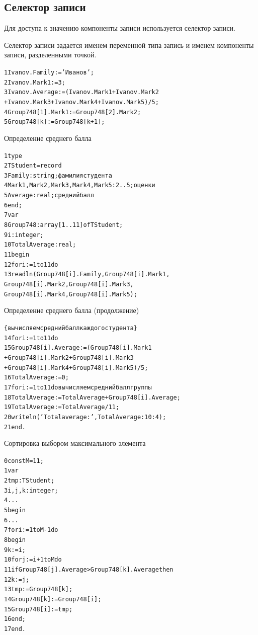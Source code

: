 \documentclass{beamer}
\begin{document}
\subsection{Селектор записи}
\begin{frame}[fragile]
Для доступа к значению компоненты записи используется селектор записи.
\begin{block}{Селектор записи}
задается именем переменной типа запись и именем компоненты записи, разделенными точкой.	
\end{block}
\begin{alltt}
1 Ivanov.Family := 'Иванов';
2 Ivanov.Mark1 := 3;
3 Ivanov.Average := (Ivanov.Mark1 + Ivanov.Mark2 
    + Ivanov.Mark3 + Ivanov.Mark4 + Ivanov.Mark5)/5;
4 Group748[1].Mark1 := Group748[2].Mark2;
5 Group748[k] := Group748[k+1];
\end{alltt}
\end{frame} 

\begin{frame}[fragile]
Определение среднего балла
\begin{alltt}
1 type
2   TStudent = record
3      Family: string; 							{фамилия студента}
4      Mark1, Mark2, Mark3, Mark4, Mark5:2..5; 	{оценки}
5      Average: real; 							{средний балл}
6   end;
7   var
8     Group748: array[1..11] of TStudent; 
9     i: integer; 
10    TotalAverage: real;
11  begin
12    for i := 1 to 11 do
13      readln(Group748[i].Family, Group748[i].Mark1, 
           Group748[i].Mark2, Group748[i].Mark3, 
           Group748[i].Mark4, Group748[i].Mark5);
\end{alltt}
\end{frame}

\begin{frame}[fragile]
Определение среднего балла (продолжение)
\begin{alltt}
\{вычисляем средний балл каждого студента\}
14   for i := 1 to 11 do 
15     Group748[i].Average := (Group748[i].Mark1 
           + Group748[i].Mark2 + Group748[i].Mark3 
           + Group748[i].Mark4 + Group748[i].Mark5) / 5;
16   TotalAverage := 0; 
17   for i := 1 to 11 do {вычисляем средний балл группы}
18     TotalAverage := TotalAverage + Group748[i].Average;
19   TotalAverage := TotalAverage / 11; 
20   writeln('Total average:', TotalAverage:10:4);
21 end.
\end{alltt}
\end{frame}

\begin{frame}[fragile]
Сортировка выбором максимального элемента
\begin{alltt}
0 const M = 11;
1 var
2	tmp: TStudent;
3	i, j, k: integer;
4   ...	
5 begin
6   ...	
7   for i := 1 to M-1 do 
8   begin
9     k := i;
10    for j := i+1 to M do  
11      if Group748[j].Average > Group748[k].Average then 
12         k := j;  
13    tmp := Group748[k];
14    Group748[k] := Group748[i];
15    Group748[i] := tmp;
16  end;
17 end.
\end{alltt}
\end{frame}
\end{document}
